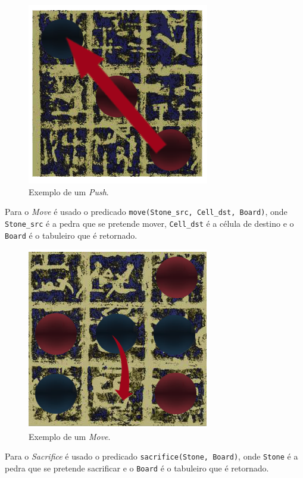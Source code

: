 \documentclass[a4paper]{article}
\begin{document}
\begin{figure}[!htb]
	\centering
	\includegraphics[scale=0.2]{images/push.png}
	\caption{Exemplo de um \textit{Push}.}
\end{figure}

\newpage

Para o \textit{Move} é usado o predicado \texttt{move(Stone\_src, Cell\_dst, Board)}, onde \texttt{Stone\_src} é a pedra que se pretende mover, \texttt{Cell\_dst} é a célula de destino e o \texttt{Board} é o tabuleiro que é retornado.

\begin{figure}[!htb]
	\centering
	\includegraphics[scale=0.3]{images/move.png}
	\caption{Exemplo de um \textit{Move}.}
\end{figure}

Para o \textit{Sacrifice} é usado o predicado \texttt{sacrifice(Stone, Board)}, onde \texttt{Stone} é a pedra que se pretende sacrificar e o \texttt{Board} é o tabuleiro que é retornado.
\end{document}
